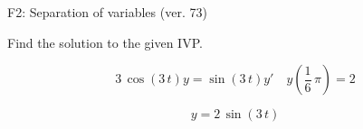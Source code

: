 \begin{exercise}
  \begin{exerciseTitle}F2: Separation of variables (ver. 73)\end{exerciseTitle}
  \begin{exerciseStatement}
    
Find the solution to the given IVP.

    
\[3 \, \cos\left(3 \, t\right) y= \sin\left(3 \, t\right) y'\hspace{1em} y\left( \frac{1}{6} \, \pi \right)= 2\]

  \end{exerciseStatement}
  \begin{exerciseAnswer}
    
\[y= 2 \, \sin\left(3 \, t\right)\]

  \end{exerciseAnswer}
\end{exercise}